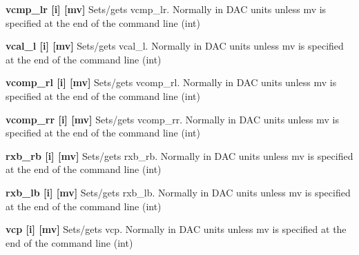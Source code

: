 \begin{DoxyItemize}
\item {\bfseries vcmp\_\-lr \mbox{[}i\mbox{]} \mbox{[}mv\mbox{]}} Sets/gets vcmp\_\-lr. Normally in DAC units unless {\ttfamily mv} is specified at the end of the command line (int)
\end{DoxyItemize}


\begin{DoxyItemize}
\item {\bfseries vcal\_\-l \mbox{[}i\mbox{]} \mbox{[}mv\mbox{]}} Sets/gets vcal\_\-l. Normally in DAC units unless {\ttfamily mv} is specified at the end of the command line (int)
\end{DoxyItemize}


\begin{DoxyItemize}
\item {\bfseries vcomp\_\-rl \mbox{[}i\mbox{]} \mbox{[}mv\mbox{]}} Sets/gets vcomp\_\-rl. Normally in DAC units unless {\ttfamily mv} is specified at the end of the command line (int)
\end{DoxyItemize}


\begin{DoxyItemize}
\item {\bfseries vcomp\_\-rr \mbox{[}i\mbox{]} \mbox{[}mv\mbox{]}} Sets/gets vcomp\_\-rr. Normally in DAC units unless {\ttfamily mv} is specified at the end of the command line (int)
\end{DoxyItemize}


\begin{DoxyItemize}
\item {\bfseries rxb\_\-rb \mbox{[}i\mbox{]} \mbox{[}mv\mbox{]}} Sets/gets rxb\_\-rb. Normally in DAC units unless {\ttfamily mv} is specified at the end of the command line (int)
\end{DoxyItemize}


\begin{DoxyItemize}
\item {\bfseries rxb\_\-lb \mbox{[}i\mbox{]} \mbox{[}mv\mbox{]}} Sets/gets rxb\_\-lb. Normally in DAC units unless {\ttfamily mv} is specified at the end of the command line (int)
\end{DoxyItemize}


\begin{DoxyItemize}
\item {\bfseries vcp \mbox{[}i\mbox{]} \mbox{[}mv\mbox{]}} Sets/gets vcp. Normally in DAC units unless {\ttfamily mv} is specified at the end of the command line (int)
\end{DoxyItemize}



